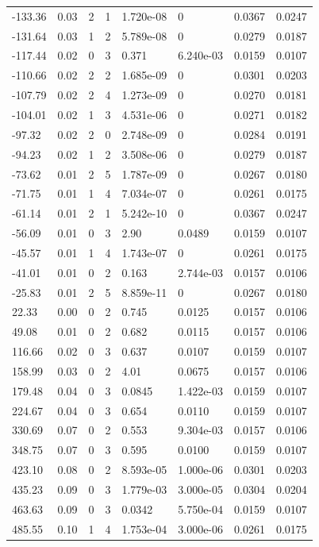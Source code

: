 \documentclass[preview]{standalone}
\begin{document}
{{\begin{tabular}{L{1.2cm}C{1.2cm} C{0.3cm}C{0.5cm} C{1.4cm}C{1.4cm} C{1.4cm}C{1.4cm}}
  -133.36  &  0.03  & 2     &  1 &  1.720e-08  & 0  & 0.0367 &  0.0247   \\ 
  -131.64  &  0.03  & 1     &  2 &  5.789e-08  & 0  & 0.0279 &  0.0187   \\ 
  -117.44  &  0.02  & 0     &  3 &  0.371  & 6.240e-03  & 0.0159 &  0.0107   \\ 
  -110.66  &  0.02  & 2     &  2 &  1.685e-09  & 0  & 0.0301 &  0.0203   \\ 
  -107.79  &  0.02  & 2     &  4 &  1.273e-09  & 0  & 0.0270 &  0.0181   \\ 
  -104.01  &  0.02  & 1     &  3 &  4.531e-06  & 0  & 0.0271 &  0.0182   \\ 
  -97.32  &  0.02  & 2     &  0 &  2.748e-09  & 0  & 0.0284 &  0.0191   \\ 
  -94.23  &  0.02  & 1     &  2 &  3.508e-06  & 0  & 0.0279 &  0.0187   \\ 
  -73.62  &  0.01  & 2     &  5 &  1.787e-09  & 0  & 0.0267 &  0.0180   \\ 
  -71.75  &  0.01  & 1     &  4 &  7.034e-07  & 0  & 0.0261 &  0.0175   \\ 
  -61.14  &  0.01  & 2     &  1 &  5.242e-10  & 0  & 0.0367 &  0.0247   \\ 
  -56.09  &  0.01  & 0     &  3 &  2.90  & 0.0489  & 0.0159 &  0.0107   \\ 
  -45.57  &  0.01  & 1     &  4 &  1.743e-07  & 0  & 0.0261 &  0.0175   \\ 
  -41.01  &  0.01  & 0     &  2 &  0.163  & 2.744e-03  & 0.0157 &  0.0106   \\ 
  -25.83  &  0.01  & 2     &  5 &  8.859e-11  & 0  & 0.0267 &  0.0180   \\ 
  22.33  &  0.00  & 0     &  2 &  0.745  & 0.0125  & 0.0157 &  0.0106   \\ 
  49.08  &  0.01  & 0     &  2 &  0.682  & 0.0115  & 0.0157 &  0.0106   \\ 
  116.66  &  0.02  & 0     &  3 &  0.637  & 0.0107  & 0.0159 &  0.0107   \\ 
  158.99  &  0.03  & 0     &  2 &  4.01  & 0.0675  & 0.0157 &  0.0106   \\ 
  179.48  &  0.04  & 0     &  3 &  0.0845  & 1.422e-03  & 0.0159 &  0.0107   \\ 
  224.67  &  0.04  & 0     &  3 &  0.654  & 0.0110  & 0.0159 &  0.0107   \\ 
  330.69  &  0.07  & 0     &  2 &  0.553  & 9.304e-03  & 0.0157 &  0.0106   \\ 
  348.75  &  0.07  & 0     &  3 &  0.595  & 0.0100  & 0.0159 &  0.0107   \\ 
  423.10  &  0.08  & 0     &  2 &  8.593e-05  & 1.000e-06  & 0.0301 &  0.0203   \\ 
  435.23  &  0.09  & 0     &  3 &  1.779e-03  & 3.000e-05  & 0.0304 &  0.0204   \\ 
  463.63  &  0.09  & 0     &  3 &  0.0342  & 5.750e-04  & 0.0159 &  0.0107   \\ 
  485.55  &  0.10  & 1     &  4 &  1.753e-04  & 3.000e-06  & 0.0261 &  0.0175   \\ 
\hline 
\end{tabular} 

}}
\end{document}
